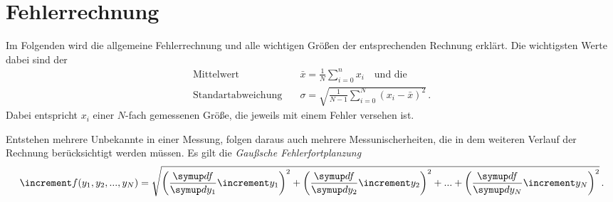 \section{Fehlerrechnung}
\label{sec:Fehlerrechnung}

Im Folgenden wird die allgemeine Fehlerrechnung und alle wichtigen Größen der entsprechenden Rechnung erklärt.
Die wichtigsten Werte dabei sind der 
\begin{align}
    \text{Mittelwert} \quad & \bar{x}  = \frac{1}{N} \sum_{i=0}^{n} x_i \quad \text{und die} \label{eq:mittelwert} \\
    \text{Standartabweichung} \quad & \sigma  = \sqrt{\frac{1}{N - 1 } \sum_{i=0}^{N} (x_i -  \bar{x})^2} \, . \label{eq:standartabweichung}
\end{align}
Dabei entspricht $x_i$ einer $N$-fach gemessenen Größe, die jeweils mit einem Fehler versehen ist.

Entstehen mehrere Unbekannte in einer Messung, folgen daraus auch mehrere Messunischerheiten,
die in dem weiteren Verlauf der Rechnung berücksichtigt werden müssen.
Es gilt die \textit{Gaußsche Fehlerfortplanzung}
\begin{equation}
    \increment f(y_1 ,y_2 ,...,y_N ) = \sqrt{\left(\frac{\dif{f}}{\dif{y_{1}}} \increment y_{1}\right)^2
    + \left(\frac{\dif{f}}{\dif{y_{2}}} \increment y_{2}\right)^2 + ... + 
    \left(\frac{\dif{f}}{\dif{y_{N}}} \increment y_{N}\right)^2
    } \, . \label{eq:fehlerfortplanzung}
\end{equation}